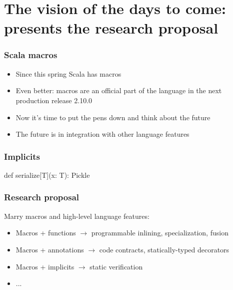 \documentclass[hyperref={bookmarks=false}]{beamer}
\begin{document}
\section{The vision of the days to come: presents the research proposal}

\begin{frame}[fragile]
\frametitle{Scala macros}
\begin{itemize}
\item Since this spring Scala has macros
\item Even better: macros are an official part of the language in the next production release 2.10.0
\item Now it's time to put the pens down and think about the future
\item The future is in integration with other language features
\end{itemize}
\end{frame}

\begin{frame}[fragile]
\frametitle{Implicits}
\begin{semiverbatim}
def serialize[T](x: T): Pickle

\end{semiverbatim}
\end{frame}

\begin{frame}[fragile]
\frametitle{Research proposal}

Marry macros and high-level language features:

\begin{itemize}
\item Macros + functions $\rightarrow$ programmable inlining, specialization, fusion
\item Macros + annotations $\rightarrow$ code contracts, statically-typed decorators
\item Macros + implicits $\rightarrow$ static verification
\item ...
\end{itemize}
\end{frame}
\end{document}
